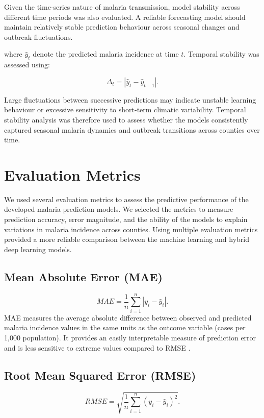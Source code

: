 Given the time-series nature of malaria transmission, model stability across different time periods was also evaluated. A reliable forecasting model should maintain relatively stable prediction behaviour across seasonal changes and outbreak fluctuations.

where \(\hat{y}_{t}\) denote the predicted malaria incidence at time \(t\). Temporal stability was assessed using:

\[
\Delta_t = |\hat{y}_{t} - \hat{y}_{t-1}|.
\]

Large fluctuations between successive predictions may indicate unstable learning behaviour or excessive sensitivity to short-term climatic variability. Temporal stability analysis was therefore used to assess whether the models consistently captured seasonal malaria dynamics and outbreak transitions across counties over time.


\section{Evaluation Metrics}
\label{sec:evaluation_metrics}

We used several evaluation metrics to assess the predictive performance of the developed malaria prediction models. We selected the metrics to measure prediction accuracy, error magnitude, and the ability of the models to explain variations in malaria incidence across counties. Using multiple evaluation metrics provided a more reliable comparison between the machine learning and hybrid deep learning models.

\subsection{Mean Absolute Error (MAE)}

\[
MAE = \frac{1}{n} \sum_{i=1}^{n} |y_i - \hat{y}_i|.
\]
MAE measures the average absolute difference between observed and predicted malaria incidence values in the same units as the outcome variable (cases per 1,000 population). It provides an easily interpretable measure of prediction error and is less sensitive to extreme values compared to RMSE \cite{Ly2025Forecasting}.

\subsection{Root Mean Squared Error (RMSE)}

\[
RMSE = \sqrt{\frac{1}{n} \sum_{i=1}^{n} (y_i - \hat{y}_i)^2}.
\]

